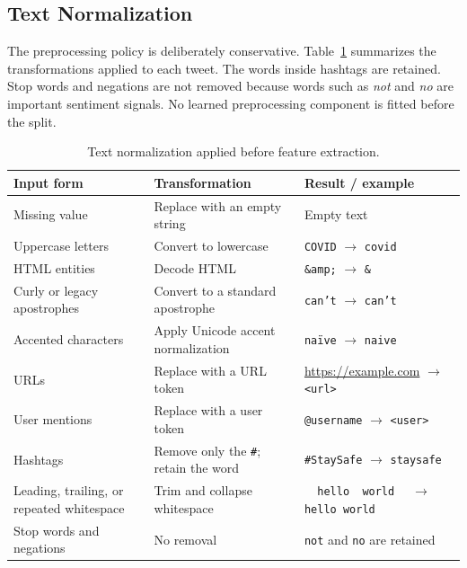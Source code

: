 \subsection{Text Normalization}

The preprocessing policy is deliberately conservative. Table~\ref{tab:text-normalization} summarizes the transformations applied to each tweet. The words inside hashtags are retained. Stop words and negations are not removed because words such as \textit{not} and \textit{no} are important sentiment signals. No learned preprocessing component is fitted before the split.

\begin{table}[H]
\centering
\small
\setlength{\tabcolsep}{5pt}
\begin{tabularx}{\textwidth}{|>{\raggedright\arraybackslash}p{4.2cm}|>{\raggedright\arraybackslash}p{4.8cm}|X|}
\hline
\textbf{Input form} & \textbf{Transformation} & \textbf{Result / example} \\
\hline
Missing value & Replace with an empty string & Empty text \\
\hline
Uppercase letters & Convert to lowercase & \texttt{COVID} $\rightarrow$ \texttt{covid} \\
\hline
HTML entities & Decode HTML & \texttt{\&amp;} $\rightarrow$ \texttt{\&} \\
\hline
Curly or legacy apostrophes & Convert to a standard apostrophe & \texttt{can’t} $\rightarrow$ \texttt{can't} \\
\hline
Accented characters & Apply Unicode accent normalization & \texttt{na\"ive} $\rightarrow$ \texttt{naive} \\
\hline
URLs & Replace with a URL token & \url{https://example.com} $\rightarrow$ \texttt{\textless url\textgreater} \\
\hline
User mentions & Replace with a user token & \texttt{@username} $\rightarrow$ \texttt{\textless user\textgreater} \\
\hline
Hashtags & Remove only the \texttt{\#}; retain the word & \texttt{\#StaySafe} $\rightarrow$ \texttt{staysafe} \\
\hline
Leading, trailing, or repeated whitespace & Trim and collapse whitespace & \texttt{\ \ hello\ \ world\ \ } $\rightarrow$ \texttt{hello world} \\
\hline
Stop words and negations & No removal & \texttt{not} and \texttt{no} are retained \\
\hline
\end{tabularx}
\caption{Text normalization applied before feature extraction.}
\label{tab:text-normalization}
\end{table}

